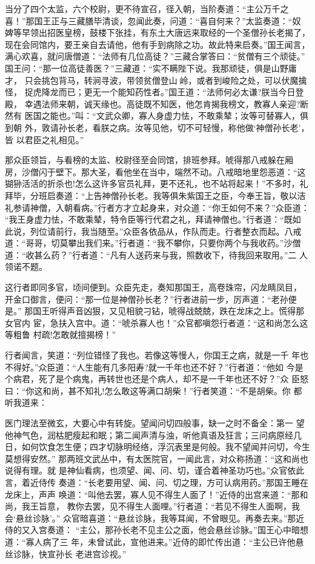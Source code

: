 当分了四个太监，六个校尉，更不待宣召，径入朝，当阶奏道：“主公万千之
喜！”那国王正与三藏膳毕清谈，忽闻此奏，问道：“喜自何来？”太监奏道：“奴
婢等早领出招医皇榜，鼓楼下张挂，有东土大唐远来取经的一个圣僧孙长老揭了，
现在会同馆内，要王亲自去请他，他有手到病除之功。故此特来启奏。”国王闻言，
满心欢喜，就问唐僧道：“法师有几位高徒？”三藏合掌答曰：“贫僧有三个顽徒。”
国王问：“那一位高徒善医？”三藏道：“实不瞒陛下说。我那顽徒，俱是山野庸才，
只会挑包背马，转涧寻波，带领贫僧登山岭，或者到峻险之处，可以伏魔擒怪，
捉虎降龙而已；更无一个能知药性者。”国王道：“法师何必太谦?朕当今日登殿，
幸遇法师来朝，诚天缘也。高徒既不知医，他怎肯揭我榜文，教寡人亲迎?断然有
医国之能也。”叫：“文武众卿，寡人身虚力怯，不敢乘辇；汝等可替寡人，俱到朝
外，敦请孙长老，看朕之病。汝等见他，切不可轻慢，称他做‘神僧孙长老’，皆
以君臣之礼相见。”

那众臣领旨，与看榜的太监、校尉径至会同馆，排班参拜。唬得那八戒躲在厢
房，沙僧闪于壁下。那大圣，看他坐在当中，端然不动。八戒暗地里怨恶道：“这
猢狲活活的折杀也!怎么这许多官员礼拜，更不还礼，也不站将起来！”不多时，礼
拜毕，分班启奏道：“上告神僧孙长老。我等俱朱紫国王之臣，今奉王旨，敬以洁
礼参请神僧，入朝看病。”行者方才立起身来，对众道：“你王如何不来？”众臣道：
“我王身虚力怯，不敢乘辇，特令臣等行代君之礼，拜请神僧也。”行者道：“既如
此说，列位请前行，我当随至。”众臣各依品从，作队而走。行者整衣而起。八戒
道：“哥哥，切莫攀出我们来。”行者道：“我不攀你，只要你两个与我收药。”沙僧
道：“收甚么药？”行者道：“凡有人送药来与我，照数收下，待我回来取用。”二
人领诺不题。

这行者即同多官，顷间便到。众臣先走，奏知那国王，高卷珠帘，闪龙睛凤目，
开金口御言，便问：“那一位是神僧孙长老？”行者进前一步，厉声道：“老孙便是。”
那国王听得声音凶狠，又见相貌刁钻，唬得战兢兢，跌在龙床之上。慌得那女官内
宦，急扶入宫中。道：“唬杀寡人也！”众官都嗔怨行者道：“这和尚怎么这等粗鲁
村疏!怎敢就擅揭榜！”

行者闻言，笑道：“列位错怪了我也。若像这等慢人，你国王之病，就是一千
年也不得好。”众臣道：“人生能有几多阳寿?就一千年也还不好？”行者道：“他如
今是个病君，死了是个病鬼，再转世也还是个病人，却不是一千年也还不好？”众
臣怒曰：“你这和尚，甚不知礼!怎么敢这等满口胡柴！”行者笑道：“不是胡柴。你
都听我道来：

医门理法至微玄，大要心中有转旋。望闻问切四般事，缺一之时不备全：第一
望他神气色，润枯肥瘦起和眠；第二闻声清与浊，听他真语及狂言；三问病原经几
日，如何饮食怎生便；四才切脉明经络，浮沉表里是何般。我不望闻并问切，今生
莫想得安然。”
那两班文武丛中，有太医院官，一闻此言，对众称扬道：“这和尚也说得有理。就
是神仙看病，也须望、闻、问、切，谨合着神圣功巧也。”众官依此言，着近侍传
奏道：“长老要用望、闻、问、切之理，方可认病用药。”那国王睡在龙床上，声声
唤道：“叫他去罢，寡人见不得生人面了！”近侍的出宫来道：“那和尚，我王旨意，
教你去罢，见不得生人面哩。”行者道：“若见不得生人面啊，我会‘悬丝诊脉’。”
众官暗喜道：“悬丝诊脉，我等耳闻，不曾眼见。再奏去来。”那近侍的又入宫奏道：
“主公，那孙长老不见主公之面，他会悬丝诊脉。”国王心中暗想道：“寡人病了三
年，未曾试此，宣他进来。”近侍的即忙传出道：“主公已许他悬丝诊脉，快宣孙长
老进宫诊视。”

